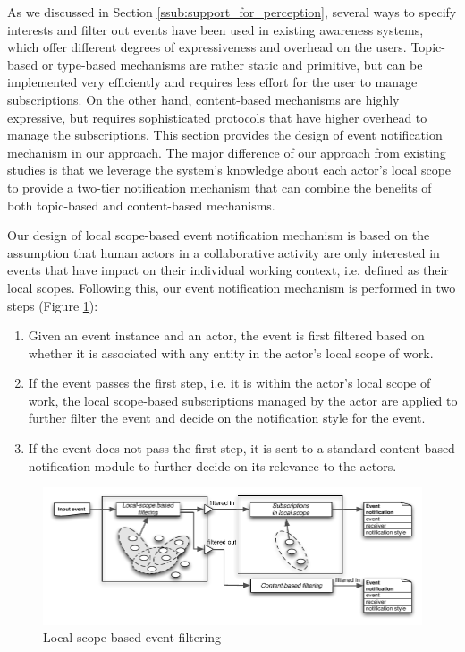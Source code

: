 As we discussed in Section \ref{ssub:support_for_perception}, several ways to specify interests and filter out events have been used in existing awareness systems, which offer different degrees of expressiveness and overhead on the users. Topic-based or type-based mechanisms are rather static and primitive, but can be implemented very efficiently and requires less effort for the user to manage subscriptions. On the other hand, content-based mechanisms are highly expressive, but requires sophisticated protocols that have higher overhead to manage the subscriptions. This section provides the design of event notification mechanism in our approach. The major difference of our approach from existing studies is that we leverage the system's knowledge about each actor's local scope to provide a two-tier notification mechanism that can combine the benefits of both topic-based and content-based mechanisms. 

Our design of local scope-based event notification mechanism is based on the assumption that human actors in a collaborative activity are only interested in events that have impact on their individual working context, i.e. defined as their local scopes. Following this, our event notification mechanism is performed in two steps (Figure \ref{fig:event_filtering}):
\begin{enumerate}
  	\item Given an event instance and an actor, the event is first filtered based on whether it is associated with any entity in the actor's local scope of work. 
  	\item If the event passes the first step, i.e. it is within the actor's local scope of work, the local scope-based subscriptions managed by the actor are applied to further filter the event and decide on the notification style for the event.
  	\item If the event does not pass the first step, it is sent to a standard content-based notification module to further decide on its relevance to the actors.
\end{enumerate}  

\begin{figure}[htbp] %
	\centering
	\includegraphics{event_filtering.pdf} 
	\caption{Local scope-based event filtering}
	\label{fig:event_filtering}
\end{figure}

